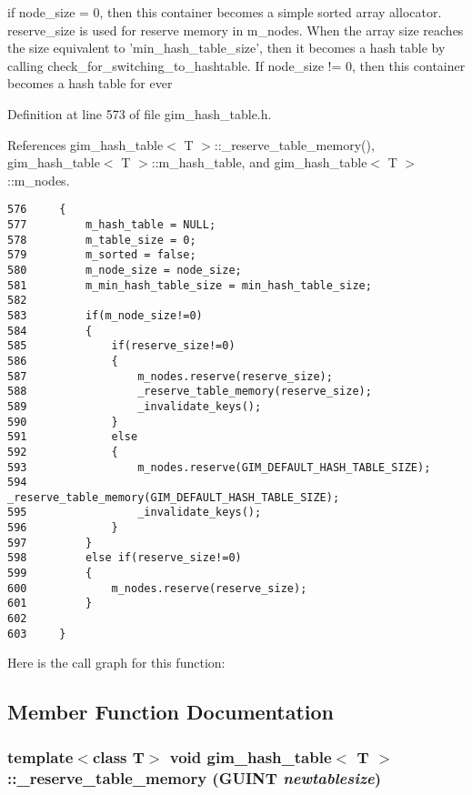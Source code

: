 if node\_\-size = 0, then this container becomes a simple sorted array allocator. reserve\_\-size is used for reserve memory in m\_\-nodes. When the array size reaches the size equivalent to 'min\_\-hash\_\-table\_\-size', then it becomes a hash table by calling check\_\-for\_\-switching\_\-to\_\-hashtable.  If node\_\-size != 0, then this container becomes a hash table for ever  

Definition at line 573 of file gim\_\-hash\_\-table.h.

References gim\_\-hash\_\-table$<$ T $>$::\_\-reserve\_\-table\_\-memory(), gim\_\-hash\_\-table$<$ T $>$::m\_\-hash\_\-table, and gim\_\-hash\_\-table$<$ T $>$::m\_\-nodes.

\begin{Code}\begin{verbatim}576     {
577         m_hash_table = NULL;
578         m_table_size = 0;
579         m_sorted = false;
580         m_node_size = node_size;
581         m_min_hash_table_size = min_hash_table_size;
582 
583         if(m_node_size!=0)
584         {
585             if(reserve_size!=0)
586             {
587                 m_nodes.reserve(reserve_size);
588                 _reserve_table_memory(reserve_size);
589                 _invalidate_keys();
590             }
591             else
592             {
593                 m_nodes.reserve(GIM_DEFAULT_HASH_TABLE_SIZE);
594                 _reserve_table_memory(GIM_DEFAULT_HASH_TABLE_SIZE);
595                 _invalidate_keys();
596             }
597         }
598         else if(reserve_size!=0)
599         {
600             m_nodes.reserve(reserve_size);
601         }
602 
603     }
\end{verbatim}
\end{Code}




Here is the call graph for this function:

\subsection{Member Function Documentation}
\hypertarget{classgim__hash__table_4d9347e131c0e17ac2d4966c092817f8}{
\subsubsection[\_\-reserve\_\-table\_\-memory]{\setlength{\rightskip}{0pt plus 5cm}template$<$class T$>$ void {\bf gim\_\-hash\_\-table}$<$ T $>$::\_\-reserve\_\-table\_\-memory (GUINT {\em newtablesize})}}
\label{classgim__hash__table_4d9347e131c0e17ac2d4966c092817f8}


